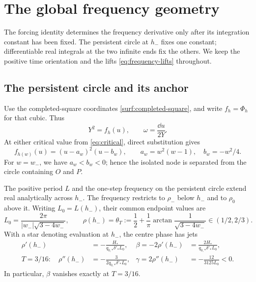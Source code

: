 \section{The global frequency geometry}\label{sec:frequency}

The forcing identity determines the frequency derivative only after its
integration constant has been fixed.  The persistent circle at $h_-$ fixes
one constant; differentiable real integrals at the two infinite ends fix
the others.  We keep the positive time orientation and the lifts
\eqref{eq:frequency-lifts} throughout.

\subsection{The persistent circle and its anchor}

Use the completed-square coordinates \eqref{surf:completed-square},
and write $f_h=\Phi_h$ for that cubic. Thus
\begin{equation}\label{freq:cubic}
 Y^2=f_h(u),\qquad \omega=\frac{\dd u}{2Y}.
\end{equation}
At either critical value from \eqref{eq:critical}, direct substitution gives
\begin{equation}\label{freq:node-factorization}
 f_{h(w)}(u)=(u-a_w)^2(u-b_w),\qquad
 a_w=w^2(w-1),\quad b_w=-w^2/4.
\end{equation}
For $w=w_-$, we have $a_w<b_w<0$; hence the isolated node is separated
from the circle containing $O$ and $P$.

\begin{lemma}\label{lem:persistent}
The positive period $L$ and the one-step frequency on the persistent
circle extend real analytically across $h_-$.  The frequency restricts
to $\rho_-$ below $h_-$ and to $\rho_0$ above it.
Writing $L_0=L(h_-)$, their common endpoint values are
\begin{equation}\label{eq:center-frequency}
 L_0=\frac{2\pi}{|w_-|\sqrt{3-4w_-}},\qquad
 \rho(h_-)=\theta_T:=\frac12+
 \frac1\pi\arctan\frac1{\sqrt{3-4w_-}}\in(1/2,2/3).
\end{equation}
With a star denoting evaluation at $h_-$, the centre phase has jets
\begin{equation}\label{eq:center-phase-jets}
 \begin{aligned}
 \rho'(h_-)&=-\frac{H_*}{q_{0,*}\delta'_*L_0},
 &\beta=-2\rho'(h_-)&=\frac{2H_*}{q_{0,*}\delta'_*L_0},\\
 T=3/16:\quad \rho''(h_-)&=-\frac{3}{2q_{0,*}\delta'_*L_0},
 &\gamma=2\rho''(h_-)&=-\frac{12}{3125L_0}<0.
 \end{aligned}
\end{equation}
In particular, $\beta$ vanishes exactly at $T=3/16$.
\end{lemma}

